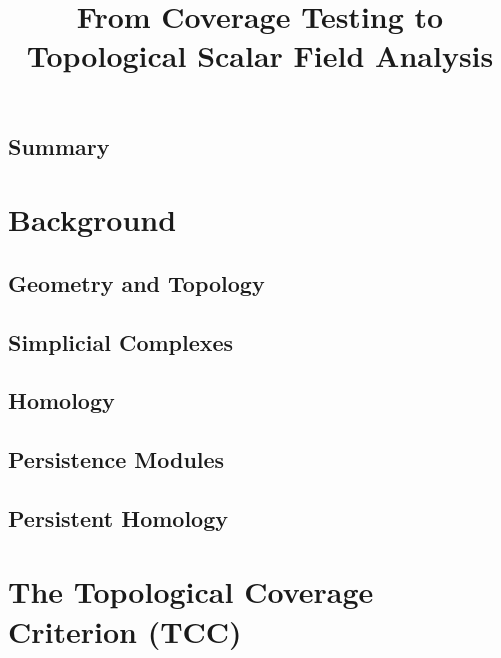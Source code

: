 \documentclass[12pt]{article}
\begin{document}
\title{From Coverage Testing to Topological Scalar Field Analysis}
\maketitle



\subsection{Summary}


\clearpage
\section{Background}

\subsection{Geometry and Topology}
  

\subsection{Simplicial Complexes}\label{sec:complexes}
  
%
%
\subsection{Homology}\label{sec:homology}
  
%
\subsection{Persistence Modules}
  
%
\subsection{Persistent Homology}
  


\clearpage
\section{The Topological Coverage Criterion (TCC)}


\clearpage


\end{document}

